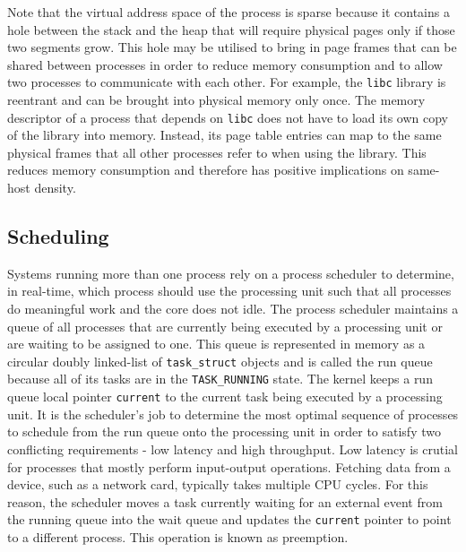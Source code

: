 Note that the virtual address space of the process is sparse because it contains a hole between the 
stack and the heap that will require physical pages only if those two segments grow. This hole may be
utilised to bring in page frames that can be shared between processes in order to reduce memory 
consumption and to allow two processes to communicate with each other. For example, the \verb|libc|
library is reentrant and can be brought into physical memory only once. The memory descriptor of a 
process that depends on \verb|libc| does not have to load its own copy of the library into memory. 
Instead, its page table entries can map to the same physical frames that all other processes refer to 
when using the library. This reduces memory consumption and therefore has positive implications 
on same-host density.

\subsection{Scheduling}
\label{ch:fundamentals/processes/execution-scheduling}
Systems running more than one process rely on a process scheduler to determine, in real-time, 
which process should use the processing unit such that all processes do meaningful work 
and the core does not idle. 
The process scheduler maintains a  queue of all processes that are currently 
being executed by a processing unit or are waiting to be assigned to one. 
This queue is represented in memory as a circular doubly linked-list of \verb|task_struct| 
objects and is called the run queue because all of its tasks are in the \verb|TASK_RUNNING| state.
The kernel keeps a run queue local pointer \verb|current| to the current task being executed by a processing unit. 
It is the scheduler's job to determine the most optimal sequence of processes to schedule from the run queue 
onto the processing unit in order to satisfy two conflicting requirements - low latency and high throughput. 
Low latency is crutial for processes that mostly perform input-output operations. 
Fetching data from a device, such as a network card, typically takes multiple CPU cycles. 
For this reason, the scheduler moves a task currently waiting for an external event from the running queue 
into the wait queue and updates the \verb|current| pointer to point to a different process. 
This operation is known as preemption. 
